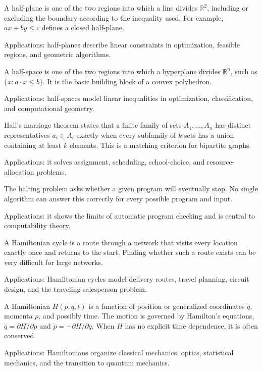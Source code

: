 A half-plane is one of the two regions into which a line divides $\mathbb{R}^2$, including or excluding the boundary according to the inequality used. For example, $ax+by\leq c$ defines a closed half-plane. \par\noindent Applications: half-planes describe linear constraints in optimization, feasible regions, and geometric algorithms.

A half-space is one of the two regions into which a hyperplane divides $\mathbb{R}^n$, such as $\{x:a\cdot x\leq b\}$. It is the basic building block of a convex polyhedron. \par\noindent Applications: half-spaces model linear inequalities in optimization, classification, and computational geometry.

Hall's marriage theorem states that a finite family of sets $A_1,\ldots,A_n$ has distinct representatives $a_i\in A_i$ exactly when every subfamily of $k$ sets has a union containing at least $k$ elements. This is a matching criterion for bipartite graphs. \par\noindent Applications: it solves assignment, scheduling, school-choice, and resource-allocation problems.

The halting problem asks whether a given program will eventually stop. No single algorithm can answer this correctly for every possible program and input. \par\noindent Applications: it shows the limits of automatic program checking and is central to computability theory.

A Hamiltonian cycle is a route through a network that visits every location exactly once and returns to the start. Finding whether such a route exists can be very difficult for large networks. \par\noindent Applications: Hamiltonian cycles model delivery routes, travel planning, circuit design, and the traveling-salesperson problem.

A Hamiltonian $H(p,q,t)$ is a function of position or generalized coordinates $q$, momenta $p$, and possibly time. The motion is governed by Hamilton's equations, $\dot q=\partial H/\partial p$ and $\dot p=-\partial H/\partial q$. When $H$ has no explicit time dependence, it is often conserved. \par\noindent Applications: Hamiltonians organize classical mechanics, optics, statistical mechanics, and the transition to quantum mechanics.

